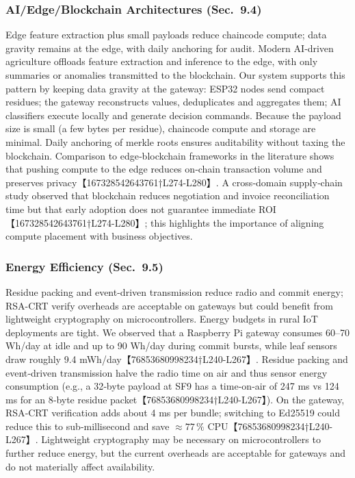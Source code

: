 \subsubsection{AI/Edge/Blockchain Architectures (Sec.~9.4)}
Edge feature extraction plus small payloads reduce chaincode compute; data gravity remains at the edge, with daily anchoring for audit. Modern AI‑driven agriculture offloads feature extraction and inference to the edge, with only summaries or anomalies transmitted to the blockchain.  Our system supports this pattern by keeping data gravity at the gateway: ESP32 nodes send compact residues; the gateway reconstructs values, deduplicates and aggregates them; AI classifiers execute locally and generate decision commands.  Because the payload size is small (a few bytes per residue), chaincode compute and storage are minimal.  Daily anchoring of merkle roots ensures auditability without taxing the blockchain.  Comparison to edge‑blockchain frameworks in the literature shows that pushing compute to the edge reduces on‑chain transaction volume and preserves privacy【167328542643761†L274-L280】.  A cross‑domain supply‑chain study observed that blockchain reduces negotiation and invoice reconciliation time but that early adoption does not guarantee immediate ROI【167328542643761†L274-L280】; this highlights the importance of aligning compute placement with business objectives.

\subsubsection{Energy Efficiency (Sec.~9.5)}
Residue packing and event-driven transmission reduce radio and commit energy; RSA-CRT verify overheads are acceptable on gateways but could benefit from lightweight cryptography on microcontrollers. Energy budgets in rural IoT deployments are tight.  We observed that a Raspberry Pi gateway consumes 60–70 Wh/day at idle and up to 90 Wh/day during commit bursts, while leaf sensors draw roughly 9.4 mWh/day【76853680998234†L240-L267】.  Residue packing and event‑driven transmission halve the radio time on air and thus sensor energy consumption (e.g., a 32‑byte payload at SF9 has a time‑on‑air of 247 ms vs 124 ms for an 8‑byte residue packet【76853680998234†L240-L267】).  On the gateway, RSA‑CRT verification adds about 4 ms per bundle; switching to Ed25519 could reduce this to sub‑millisecond and save \(\approx77\,\%\) CPU【76853680998234†L240-L267】.  Lightweight cryptography may be necessary on microcontrollers to further reduce energy, but the current overheads are acceptable for gateways and do not materially affect availability.

